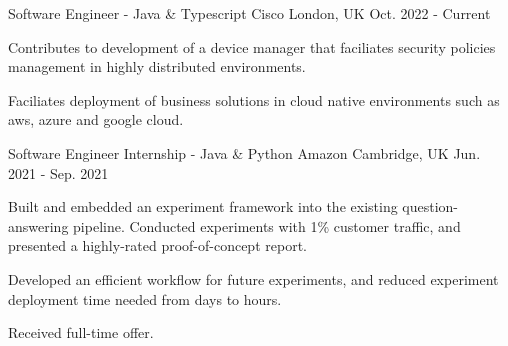 

\begin{cventries}


\cventry
    {Software Engineer - Java \& Typescript} %
    {Cisco} %
    {London, UK} %
    {Oct. 2022 - Current} %
    {
      \begin{cvitems} %
        \item {Contributes to development of a device manager that faciliates security policies management in highly distributed environments.}
        \item {Faciliates deployment of business solutions in cloud native environments such as aws, azure and google cloud.}
      \end{cvitems}
    }

  \cventry
    {Software Engineer Internship - Java \& Python} %
    {Amazon} %
    {Cambridge, UK} %
    {Jun. 2021 - Sep. 2021} %
    {
      \begin{cvitems} %
        \item {Built and embedded an experiment framework into the existing question-answering pipeline. Conducted experiments with 1\% customer traffic, and presented a highly-rated proof-of-concept report.}
        \item {Developed an efficient workflow for future experiments, and reduced experiment deployment time needed from days to hours.}
        \item {Received full-time offer.}
      \end{cvitems}
    }


\end{cventries}
